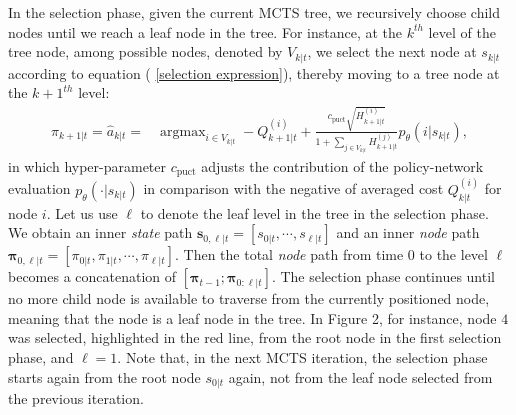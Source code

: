 \documentclass{article}
\DeclareMathOperator*{\argmax}{argmax}
\begin{document}
In the selection phase, given the current MCTS tree, we recursively choose child nodes until we reach a leaf node in the tree. For instance, at the $k^{th}$ level of the tree node, among possible nodes, denoted by $V_{k|t}$, we select the next node at $s_{k|t}$ according to equation ( \ref{selection expression}), thereby moving to a tree node at the $k+1^{th}$ level:
\begin{align}\label{selection expression}
    \pi_{k+1|t} = \hat{a}_{k|t} = & \argmax_{i \in V_{k|t}} -Q^{(i)}_{k+1|t} +  \frac{c_{\mbox{puct}} \sqrt{H^{(i)}_{k+1|t}}}{1 + \sum_{j\in V_{k|t}}H^{(j)}_{k+1|t}} p_{\theta}(i| s_{k|t}),
\end{align}
in which hyper-parameter $c_{\mbox{puct}}$ adjusts the contribution of the policy-network evaluation $p_{\theta}(\cdot| s_{k|t})$ in comparison with the negative of averaged cost $Q^{(i)}_{k|t}$ for node $i$.  Let us use $\ell$ to denote the leaf level in the tree in the selection phase.
We obtain an inner \textit{state} path $\boldsymbol{s}_{0,\ell|t} = [s_{0|t}, \cdots, s_{\ell|t}]$ and an inner \textit{node} path $\boldsymbol{\pi}_{0,\ell | t} = [\pi_{0|t}, \pi_{1|t}, \cdots, \pi_{\ell|t}]$. Then the total \textit{node} path from time $0$ to the level $\ell$ becomes a concatenation of $[\boldsymbol{\pi}_{t-1}; \boldsymbol{\pi}_{0:\ell | t}]$.
The selection phase continues until no more child node is available to traverse from the currently positioned node, meaning that the node is a leaf node in the tree.
In Figure 2, for instance, node $4$ was selected, highlighted in the red line,  from the root node in the first selection phase, and $\ell=1$. Note that, in the next MCTS iteration, the selection phase starts again from the root node $s_{0|t}$ again, not from the leaf node selected from the previous iteration.





\end{document}

